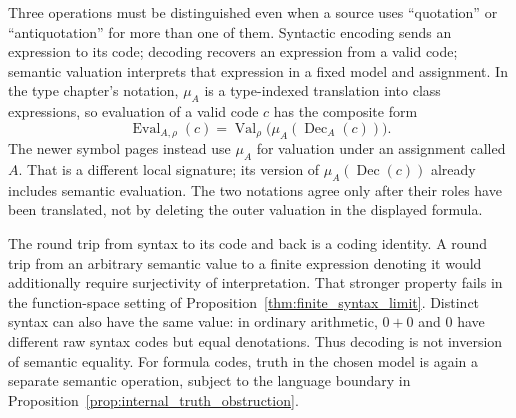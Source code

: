 \begin{note}
Three operations must be distinguished even when a source uses
``quotation'' or ``antiquotation'' for more than one of them.
Syntactic encoding sends an expression to its code; decoding recovers
an expression from a valid code; semantic valuation interprets that
expression in a fixed model and assignment. In the type chapter's
notation, $\mu_A$ is a type-indexed translation into class expressions,
so evaluation of a valid code $c$ has the composite form
\[
\operatorname{Eval}_{A,\rho}(c)
 =\operatorname{Val}_{\rho}
       \bigl(\mu_A(\operatorname{Dec}_A(c))\bigr).
\]
The newer symbol pages instead use $\mu_A$ for valuation under an
assignment called $A$. That is a different local signature; its version
of $\mu_A(\operatorname{Dec}(c))$ already includes semantic evaluation.
The two notations agree only after their roles have been translated,
not by deleting the outer valuation in the displayed formula.

The round trip from syntax to its code and back is a coding identity.
A round trip from an arbitrary semantic value to a finite expression
denoting it would additionally require surjectivity of interpretation.
That stronger property fails in the function-space setting of
Proposition~\ref{thm:finite_syntax_limit}. Distinct syntax can also have
the same value: in ordinary arithmetic, $0+0$ and $0$ have different
raw syntax codes but equal denotations. Thus decoding is not inversion
of semantic equality. For formula codes, truth in the chosen model is
again a separate semantic operation, subject to the language boundary
in Proposition~\ref{prop:internal_truth_obstruction}.
\end{note}

